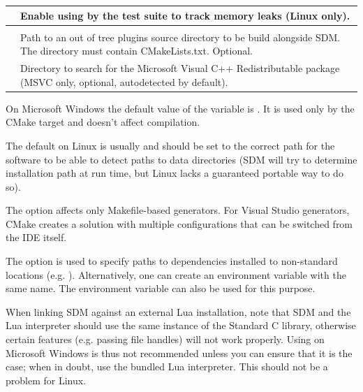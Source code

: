 \documentclass[a4paper,12pt,twoside,extrafontsizes]{memoir}
\begin{document}
\begin{table}[htbp]
\begin{tabularx}{\textwidth}{lL}
 & Enable using  by the test suite to track memory leaks (Linux only). \\

\midrule
{}\\
\midrule

 & Path to an out of tree plugins source directory to be build alongside SDM. The directory must contain CMakeLists.txt. Optional.\\

 & Directory to search for the Microsoft Visual C++ Redistributable package (MSVC only, optional, autodetected by default).\\

\bottomrule
\end{tabularx}
\end{table}

On Microsoft Windows the default value of the  variable is . It is used only by the CMake  target and doesn't affect compilation.

The default  on Linux is usually  and should be set to the correct path for the software to be able to detect paths to data directories (SDM will try to determine installation path at run time, but Linux lacks a guaranteed portable way to do so).

The  option affects only Makefile-based generators. For Visual Studio generators, CMake creates a solution with multiple configurations that can be switched from the IDE itself.

The  option is used to specify paths to dependencies installed to non-standard locations (e.g. ). Alternatively, one can create an environment variable with the same name. The  environment variable can also be used for this purpose.

When linking SDM against an external Lua installation, note that SDM and the Lua interpreter should use the same instance of the Standard C library, otherwise certain features (e.g. passing file handles) will not work properly. Using  on Microsoft Windows is thus not recommended unless you can ensure that it is the case; when in doubt, use the bundled Lua interpreter. This should not be a problem for Linux.
\end{document}
